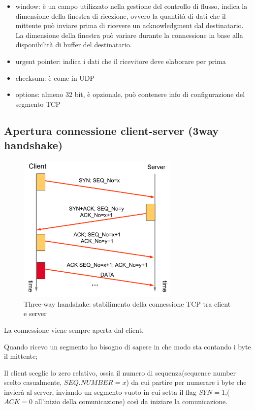 \begin{itemize}
\begin{itemize}
        \end{itemize}
    \item window: è un campo utilizzato nella gestione del controllo di flusso, indica la dimensione della finestra di ricezione, ovvero la quantità di dati che il mittente può inviare prima di ricevere un acknowledgment dal destinatario. La dimensione della finestra può variare durante la connessione in base alla disponibilità di buffer del destinatario.
    \item urgent pointer: indica i dati che il ricevitore deve elaborare per prima
    \item checksum: è come in UDP
    \item options: almeno 32 bit, è opzionale, può contenere info di configurazione del segmento TCP 
\end{itemize}


\subsection{Apertura connessione client-server (3way handshake)}
 
\begin{figure}[h!]
    \centering
    \includegraphics[width=0.7\textwidth]{images/three_w_hs1.png}
    \caption{Three-way handshake: stabilimento della connessione TCP tra client e server}
    \label{fig:threewayhandshake}
\end{figure}

La connessione viene sempre aperta dal client.

Quando ricevo un segmento ho bisogno di sapere in che modo sta contando i byte il mittente; 

Il client sceglie lo zero relativo, ossia il numero di sequenza(sequence number scelto casualmente, $SEQ.NUMBER = x$) da cui partire per numerare i byte che invierà al server, inviando un segmento vuoto in cui setta il flag $SYN = 1$,($ACK = 0$ all'inizio della comunicazione) così da iniziare la comunicazione.


